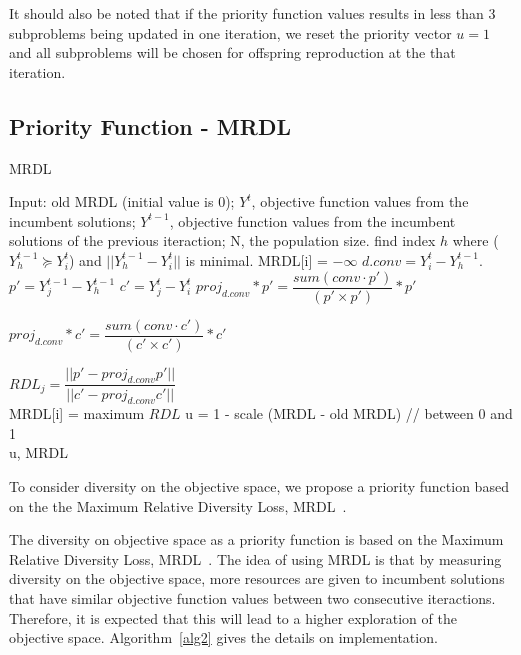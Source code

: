  It should also be noted that if the priority function values results in less than 3 subproblems being updated in one iteration, we reset the priority vector $u = 1$  and all subproblems will be chosen for offspring reproduction at the that iteration.


\subsection{Priority Function - MRDL} 


\begin{algorithm}[t]
	\caption{MRDL}\label{alg2}
	\begin{algorithmic}[1]
		
		\State Input: old MRDL (initial value is 0); $Y^t$, objective function values from the incumbent solutions; $Y^{t-1}$, objective function values from the incumbent solutions of the previous iteraction; N, the population size.		
		\State find index $h$ where  ($Y^{t-1}_h \succeq Y^t_i$) and $||Y^{t-1}_h - Y^t_i  ||$ is minimal.
		\State MRDL[i] = $-\infty$
		\Else
		\State $d.conv = Y^t_i - Y^{t-1}_h$.
		\State $p \prime = Y^{t-1}_j - Y^{t-1}_h$
		\State $c \prime = Y^t_j - Y^t_i$
		\State $proj_{d.conv}*p \prime = \dfrac{sum(conv \cdot p \prime)}{(p \prime \times p \prime)}*p \prime$
		
		\State $ proj_{d.conv}*c \prime = \dfrac{sum(conv \cdot c \prime)}{(c \prime \times c \prime)}*c \prime$
		
		\State $RDL_j = \dfrac{ ||p \prime - proj_{d.conv}p \prime|| }{||c \prime - proj_{d.conv}c \prime||}$\\
		
		\EndFor
		MRDL[i] = maximum $RDL$
		\EndIf
		\EndFor
		\State u = 1 - scale (MRDL - old MRDL) // between 0 and 1\\
	\Return u, MRDL
	\end{algorithmic}
\end{algorithm}

To consider diversity on the objective space, we propose a priority function based on the the Maximum Relative Diversity Loss, MRDL~\cite{gee2015online}.


The diversity on objective space as a priority function  is based on the Maximum Relative Diversity Loss, MRDL~\cite{gee2015online}.  The idea of using MRDL is that by measuring diversity on the objective space, more resources are given to incumbent solutions that have similar objective function values between two consecutive iteractions. Therefore, it is expected that this will lead to a higher exploration of the objective space. Algorithm~\ref{alg2} gives the details on implementation.

